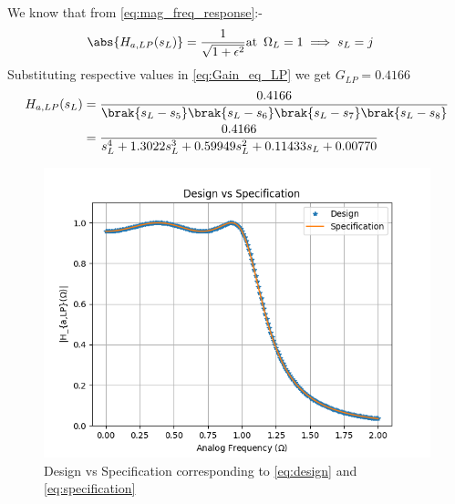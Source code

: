 \documentclass{article}
\begin{document}
\begin{enumerate}
We know that from \eqref{eq:mag_freq_response}:-
\begin{align}
    \abs{ H_{a,LP}(s_L)} &= \frac{1}{\sqrt{1+\epsilon^2}} \text{at} \hspace{5pt} \Omega_{L}=1 \implies s_{L} = j \label{eq:Gain_eq_LP} 
\end{align}
Substituting respective values in \eqref{eq:Gain_eq_LP} we get $G_{LP}=0.4166$
\begin{align}
     H_{a,LP}(s_L) &= \frac{0.4166}{\brak{s_L-s_5}\brak{s_L-s_6}\brak{s_L-s_7}\brak{s_L-s_8}}\\
     &= \frac{0.4166}{s_{L}^4 + 1.3022s_{L}^3 +0.59949s_{L}^2 + 0.11433s_{L} +0.00770}\label{eq:design}
\end{align}
\begin{figure}[H]
\centering
\includegraphics[width=1\columnwidth]{figs/Design_vs_Specification.png}
\caption{Design vs Specification corresponding to \eqref{eq:design} and \eqref{eq:specification}}
\label{fig:design_vs_specf}
\end{figure}


\end{enumerate}
\end{document}

